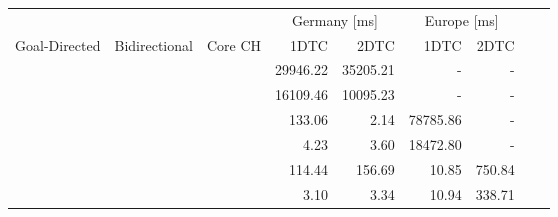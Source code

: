 \begin{tabular}{cccrrrrrr}
	\toprule
	              &               &         & \multicolumn{2}{c}{Germany [\si{\milli\second}]} & \multicolumn{2}{c}{Europe [\si{\milli\second}]}               \\
	Goal-Directed & Bidirectional & Core CH & 1DTC                                             & 2DTC                                            & 1DTC & 2DTC \\
	\midrule
	\xmark        & \xmark        & \xmark  & 29946.22                                                & 35205.21                                               & -    & -    \\
	\xmark        & \cmark        & \xmark  & 16109.46                                                & 10095.23                                               & -    & -    \\
	\cmark        & \xmark        & \xmark  & 133.06                                                & 2.14                                               & 78785.86    & -    \\
	\cmark        & \cmark        & \xmark  & 4.23                                                & 3.60                                               & 18472.80    & -    \\
	\xmark        & \cmark        & \cmark  & 114.44                                                & 156.69                                               & 10.85    & 750.84    \\
	\cmark        & \cmark        & \cmark  & 3.10                                                & 3.34                                               & 10.94    & 338.71    \\
	\bottomrule
\end{tabular}